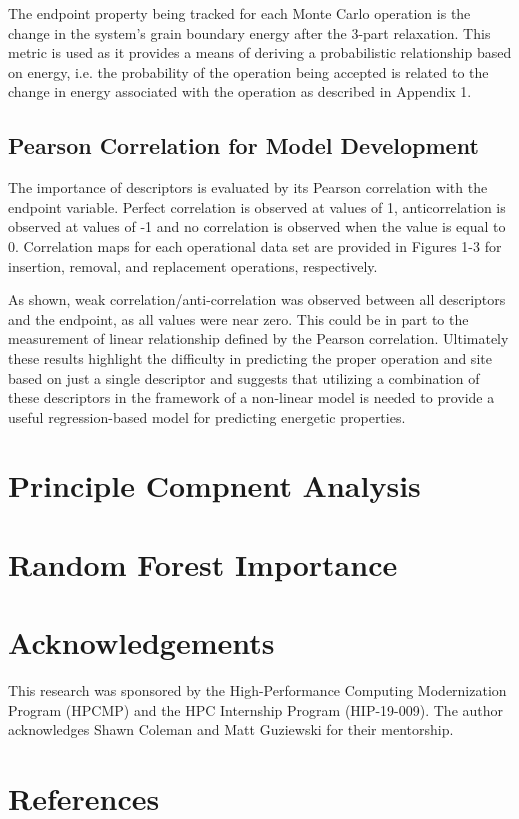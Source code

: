 \documentclass[aip,reprint,longbibliography,amsmath,amssymb,twocolumn,superscriptaddress]{revtex4-1}
\begin{document}
The endpoint property being tracked for each Monte Carlo operation is the change in the system’s grain boundary energy after the 3-part relaxation. 
%
This metric is used as it provides a means of deriving a probabilistic relationship based on energy, i.e. the probability of the operation being accepted is related to the change in energy associated with the operation as described in Appendix 1. 

\subsection{Pearson Correlation for Model Development}

The importance of descriptors is evaluated by its Pearson correlation with the endpoint variable. Perfect correlation is observed at values of 1, anticorrelation is observed at values of -1 and no correlation is observed when the value is equal to 0. 
%
Correlation maps for each operational data set are provided in Figures 1-3 for insertion, removal, and replacement operations, respectively.  


As shown, weak correlation/anti-correlation was observed between all descriptors and the endpoint, as all values were near zero.  
%
This could be in part to the measurement of linear relationship defined by the Pearson correlation.  
%
Ultimately these results highlight the difficulty in predicting the proper operation and site based on just a single descriptor and suggests that utilizing a combination of these descriptors in the framework of a non-linear model is needed to provide a useful regression-based model for predicting energetic properties. 

\section{Principle Compnent Analysis}

\section{Random Forest Importance}

\section{Acknowledgements}
This research was sponsored by the High-Performance Computing Modernization Program (HPCMP) and the HPC Internship Program (HIP-19-009). 
%
The author acknowledges Shawn Coleman and Matt Guziewski for their mentorship.

\section{References}
 
\end{document}
